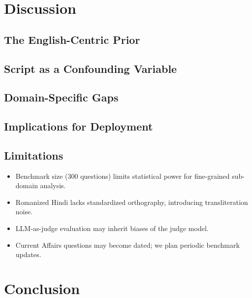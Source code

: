 \documentclass[11pt,a4paper]{article}
\begin{document}
\section{Discussion}
\label{sec:discussion}

\subsection{The English-Centric Prior}

\subsection{Script as a Confounding Variable}

\subsection{Domain-Specific Gaps}

\subsection{Implications for Deployment}

\subsection{Limitations}
\begin{itemize}
    \item Benchmark size (300 questions) limits statistical power for fine-grained sub-domain analysis.
    \item Romanized Hindi lacks standardized orthography, introducing transliteration noise.
    \item LLM-as-judge evaluation may inherit biases of the judge model.
    \item Current Affairs questions may become dated; we plan periodic benchmark updates.
\end{itemize}

\section{Conclusion}
\label{sec:conclusion}
\end{document}
